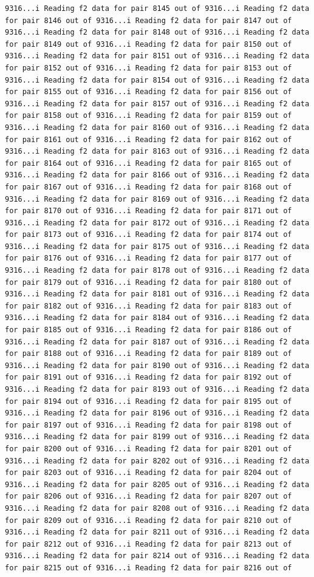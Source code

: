 \documentclass[
]{article}
\begin{document}
\begin{verbatim}
9316...i Reading f2 data for pair 8145 out of 9316...i Reading f2 data for pair 8146 out of 9316...i Reading f2 data for pair 8147 out of 9316...i Reading f2 data for pair 8148 out of 9316...i Reading f2 data for pair 8149 out of 9316...i Reading f2 data for pair 8150 out of 9316...i Reading f2 data for pair 8151 out of 9316...i Reading f2 data for pair 8152 out of 9316...i Reading f2 data for pair 8153 out of 9316...i Reading f2 data for pair 8154 out of 9316...i Reading f2 data for pair 8155 out of 9316...i Reading f2 data for pair 8156 out of 9316...i Reading f2 data for pair 8157 out of 9316...i Reading f2 data for pair 8158 out of 9316...i Reading f2 data for pair 8159 out of 9316...i Reading f2 data for pair 8160 out of 9316...i Reading f2 data for pair 8161 out of 9316...i Reading f2 data for pair 8162 out of 9316...i Reading f2 data for pair 8163 out of 9316...i Reading f2 data for pair 8164 out of 9316...i Reading f2 data for pair 8165 out of 9316...i Reading f2 data for pair 8166 out of 9316...i Reading f2 data for pair 8167 out of 9316...i Reading f2 data for pair 8168 out of 9316...i Reading f2 data for pair 8169 out of 9316...i Reading f2 data for pair 8170 out of 9316...i Reading f2 data for pair 8171 out of 9316...i Reading f2 data for pair 8172 out of 9316...i Reading f2 data for pair 8173 out of 9316...i Reading f2 data for pair 8174 out of 9316...i Reading f2 data for pair 8175 out of 9316...i Reading f2 data for pair 8176 out of 9316...i Reading f2 data for pair 8177 out of 9316...i Reading f2 data for pair 8178 out of 9316...i Reading f2 data for pair 8179 out of 9316...i Reading f2 data for pair 8180 out of 9316...i Reading f2 data for pair 8181 out of 9316...i Reading f2 data for pair 8182 out of 9316...i Reading f2 data for pair 8183 out of 9316...i Reading f2 data for pair 8184 out of 9316...i Reading f2 data for pair 8185 out of 9316...i Reading f2 data for pair 8186 out of 9316...i Reading f2 data for pair 8187 out of 9316...i Reading f2 data for pair 8188 out of 9316...i Reading f2 data for pair 8189 out of 9316...i Reading f2 data for pair 8190 out of 9316...i Reading f2 data for pair 8191 out of 9316...i Reading f2 data for pair 8192 out of 9316...i Reading f2 data for pair 8193 out of 9316...i Reading f2 data for pair 8194 out of 9316...i Reading f2 data for pair 8195 out of 9316...i Reading f2 data for pair 8196 out of 9316...i Reading f2 data for pair 8197 out of 9316...i Reading f2 data for pair 8198 out of 9316...i Reading f2 data for pair 8199 out of 9316...i Reading f2 data for pair 8200 out of 9316...i Reading f2 data for pair 8201 out of 9316...i Reading f2 data for pair 8202 out of 9316...i Reading f2 data for pair 8203 out of 9316...i Reading f2 data for pair 8204 out of 9316...i Reading f2 data for pair 8205 out of 9316...i Reading f2 data for pair 8206 out of 9316...i Reading f2 data for pair 8207 out of 9316...i Reading f2 data for pair 8208 out of 9316...i Reading f2 data for pair 8209 out of 9316...i Reading f2 data for pair 8210 out of 9316...i Reading f2 data for pair 8211 out of 9316...i Reading f2 data for pair 8212 out of 9316...i Reading f2 data for pair 8213 out of 9316...i Reading f2 data for pair 8214 out of 9316...i Reading f2 data for pair 8215 out of 9316...i Reading f2 data for pair 8216 out of 
\end{verbatim}
\end{document}

